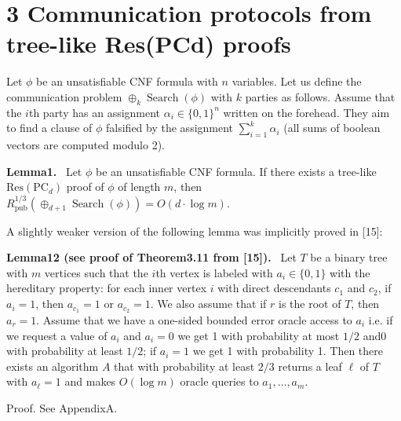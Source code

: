 \documentclass[10pt,a4paper]{article}
\newenvironment{authorclaim}[1]{\par\medskip\noindent\textbf{#1.}\ \ignorespaces}{\par\medskip}
\begin{document}
\section*{3 Communication protocols from tree-like Res(PCd) proofs}
Let $\phi$ be an unsatisfiable CNF formula with $n$ variables. Let us define the communication problem $\oplus_k\operatorname{Search}(\phi)$ with $k$ parties as follows. Assume that the $i$th party has an assignment $\alpha_i\in\{0,1\}^n$ written on the forehead. They aim to find a clause of $\phi$ falsified by the assignment $\sum_{i=1}^k\alpha_i$ (all sums of boolean vectors are computed modulo 2).
\begin{authorclaim}{Lemma1}
Let $\phi$ be an unsatisfiable CNF formula. If there exists a tree-like $\mathrm{Res}(\mathrm{PC}_d)$ proof of $\phi$ of length $m$, then $R^{1/3}_{\mathrm{pub}}(\oplus_{d+1}\operatorname{Search}(\phi))=O(d\cdot\log m)$.
\end{authorclaim}
A slightly weaker version of the following lemma was implicitly proved in [15]:
\begin{authorclaim}{Lemma12 (see proof of Theorem3.11 from [15])}
Let $T$ be a binary tree with $m$ vertices such that the $i$th vertex is labeled with $a_i\in\{0,1\}$ with the hereditary property: for each inner vertex $i$ with direct descendants $c_1$ and $c_2$, if $a_i=1$, then $a_{c_1}=1$ or $a_{c_2}=1$. We also assume that if $r$ is the root of $T$, then $a_r=1$. Assume that we have a one-sided bounded error oracle access to $a_i$ i.e. if we request a value of $a_i$ and $a_i=0$ we get 1 with probability at most $1/2$ and0 with probability at least $1/2$; if $a_i=1$ we get 1 with probability 1. Then there exists an algorithm $A$ that with probability at least $2/3$ returns a leaf $\ell$ of $T$ with $a_\ell=1$ and makes $O(\log m)$ oracle queries to $a_1,\ldots,a_m$.
\end{authorclaim}
Proof. See AppendixA.
\end{document}
